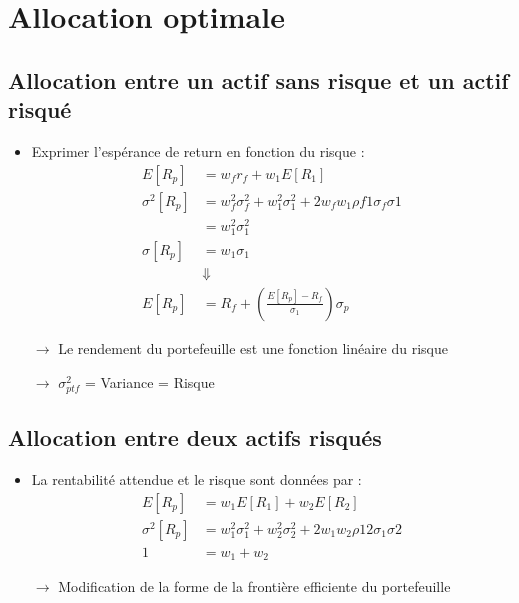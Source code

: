 \section{Allocation optimale}

\subsection{Allocation entre un actif sans risque et un actif risqué}

\begin{itemize}
    \item Exprimer l'espérance de return en fonction du risque :
    \begin{align*}
               E[R_p] &= w_f r_f + w_1 E[R_1] \\
        \sigma^2[R_p] &= w_f^2 \sigma_f^2 + w_1^2 \sigma_1^2 + 2 w_f w_1 \rho{f1} \sigma_f \sigma1 \\
                      &= w_1^2 \sigma_1^2 \\
          \sigma[R_p] &= w_1 \sigma_1 \\
                      &\Downarrow \\
               E[R_p] &= R_f + \left( \frac{E[R_p] - R_f}{\sigma_1} \right) \sigma_p
    \end{align*}
    \item[$\rightarrow$] Le rendement du portefeuille est une fonction linéaire du risque
    \item[$\rightarrow$] $\sigma_{ptf}^2$ = Variance = Risque
\end{itemize}

\subsection{Allocation entre deux actifs risqués}

\begin{itemize}
    \item La rentabilité attendue et le risque sont données par :
    \begin{align*}
               E[R_p] &= w_1 E[R_1] + w_2 E[R_2] \\
        \sigma^2[R_p] &= w_1^2 \sigma_1^2 + w_2^2 \sigma_2^2 + 2 w_1 w_2 \rho{12} \sigma_1 \sigma2 \\
                    1 &= w_1 + w_2
    \end{align*}
    \item[$\rightarrow$] Modification de la forme de la frontière efficiente du portefeuille
\end{itemize}

